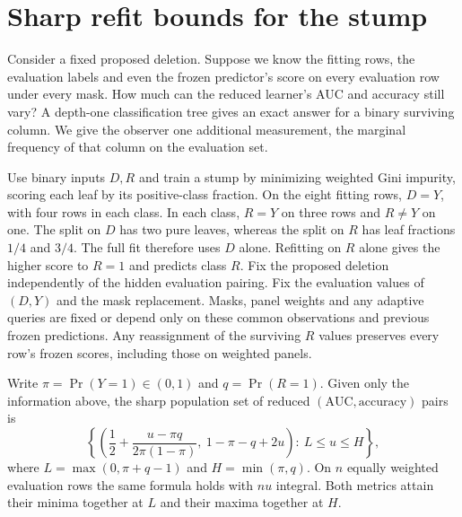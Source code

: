 \section{Sharp refit bounds for the stump}
\label{sec:identification}
Consider a fixed proposed deletion. Suppose we know the fitting rows, the evaluation labels and even the frozen predictor's score on every evaluation row under every mask. How much can the reduced learner's AUC and accuracy still vary? A depth-one classification tree gives an exact answer for a binary surviving column. We give the observer one additional measurement, the marginal frequency of that column on the evaluation set.

Use binary inputs $D,R$ and train a stump by minimizing weighted Gini impurity, scoring each leaf by its positive-class fraction. On the eight fitting rows, $D=Y$, with four rows in each class. In each class, $R=Y$ on three rows and $R\ne Y$ on one. The split on $D$ has two pure leaves, whereas the split on $R$ has leaf fractions $1/4$ and $3/4$. The full fit therefore uses $D$ alone. Refitting on $R$ alone gives the higher score to $R=1$ and predicts class $R$. Fix the proposed deletion independently of the hidden evaluation pairing. Fix the evaluation values of $(D,Y)$ and the mask replacement. Masks, panel weights and any adaptive queries are fixed or depend only on these common observations and previous frozen predictions. Any reassignment of the surviving $R$ values preserves every row's frozen scores, including those on weighted panels.

\begin{proposition}
\label{prop:refit-identification}
Write $\pi=\Pr(Y=1)\in(0,1)$ and $q=\Pr(R=1)$. Given only the information above, the sharp population set of reduced $(\mathrm{AUC},\mathrm{accuracy})$ pairs is
\begin{equation}
 \left\{\left(\frac12+\frac{u-\pi q}{2\pi(1-\pi)},\
                  1-\pi-q+2u\right):\
       L\le u\le H\right\},                                      \label{eq:refit-range}
\end{equation}
where $L=\max(0,\pi+q-1)$ and $H=\min(\pi,q)$. On $n$ equally weighted evaluation rows the same formula holds with $nu$ integral. Both metrics attain their minima together at $L$ and their maxima together at $H$.
\end{proposition}

